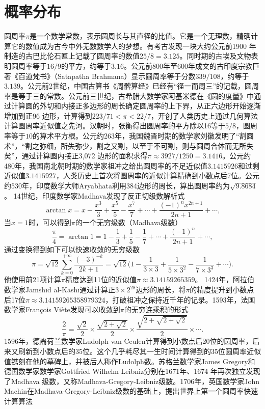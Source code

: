 \section{概率分布}
\begin{example}[圆周率与统计]\label{eg:pistat}
圆周率$\pi$是一个数学常数，表示圆周长与其直径的比值。它是一个无理数，精确计算它的数值成为古今中外无数数学人的梦想。有考古发现一块大约公元前1900 年制造的古巴比伦石匾上记载了圆周率的数值$25/8=3.125$。同时期的古埃及文物表明圆周率等于$16/9$的平方，约等于$3.16$。公元前800年至600年成文的古印度宗教巨著《百道梵书》（Satapatha Brahmana）显示圆周率等于分数$339/108$，约等于$3.139$。公元前2世纪，中国古算书《周髀算经》已经有“径一而周三”的记载，圆周率是等于三的常数。公元前三世纪，古希腊大数学家阿基米德在《圆的度量》中通过计算圆的外切和内接正多边形的周长确定圆周率的上下界，从正六边形开始逐渐增加到正96 边形，计算得到$223/71<\pi<22/7$，开创了人类历史上通过几何算法计算圆周率近似值之先河。汉朝时，张衡得出圆周率的平方除以16等于$5/8$，圆周率等于$10$的算术平方根。公元约263年，我国魏晋时期的数学家刘徽发明了“割圆术”，“割之弥细，所失弥少，割之又割，以至于不可割，则与圆周合体而无所失矣”，通过计算圆内接正3,072 边形的面积求得$\pi\approx 3927/1250=3.1416$。公元约480年，我国南北朝时期的数学家祖冲之给出圆周率的不足近似值$3.1415926$和过剩近似值$3.1415927$，人类历史上首次将圆周率的近似计算精确到小数点后7位。公元约530年，印度数学大师Aryabhata利用384边形的周长，算出圆周率约为$\sqrt{9.8684}$。
14世纪，印度数学家Madhava发现了反正切级数解析式
\[
    \arctan x = x - \frac{x^3}{3} + \frac{x^5}{5} - \frac{x^7}{7} + \cdots + \frac{(-1)^n x^{2n+1}}{2n+1} + \cdots,
\]
当$x=1$时，可以得到$\pi$的一个无穷级数（Madhava级数）
\[
    \frac{\pi}{4} = \arctan 1 = 1 - \frac{1}{3} + \frac{1}{5} - \frac{1}{7} + \cdots + \frac{(-1)^n}{2n+1} + \cdots,
\]
通过变换得到如下可以快速收敛的无穷级数
\[
    \pi = \sqrt{12} \sum\limits_{k=0}^{+\infty} \frac{(-3)^{-k}}{2k+1} = \sqrt{12} \big(1 - \frac{1}{3\times 3} + \frac{1}{5\times 3^2} - \frac{1}{7\times 3^3} + \cdots\big).
\]
他使用前21项计算$\pi$精度达到11位的近似值$\pi\approx 3.14159265359$。
1424年，阿拉伯数学家Jamsh\={i}d al-K\={a}sh\={i}通过计算正$3\times2^{28}$边形的周长，将$\pi$的精度提升到小数点后17位$\pi \approx 3.14159265358979324$，打破祖冲之保持近千年的记录。1593年，法国数学家Fran\c{c}ois Vi\`{e}te发现可以收敛到$\pi$的无穷连乘积的形式
\[
    \frac{2}{\pi} = \frac{\sqrt 2}{2}\times \frac{\sqrt{2+\sqrt 2}}{2} \times \frac{\sqrt{2 + \sqrt{2+\sqrt 2}}}{2} \times \cdots.
\]
1596年，德裔荷兰数学家Ludolph van Ceulen计算得到小数点后20位的圆周率，后来又刷新到小数点后的35位。这个几乎耗尽其一生时间计算得到的35位圆周率近似值镌刻在他的墓碑上，并被后人称作Ludolph数。苏格兰数学家James Gregory和德国数学家数学家Gottfried Wilhelm Leibniz分别在1671年、1674 年再次独立发现了Madhava 级数，又称Madhava-Gregory-Leibniz级数。1706年，英国数学家John Machin在Madhava-Gregory-Leibniz级数的基础上，提出世界上第一个圆周率快速计算算法

\end{example}
